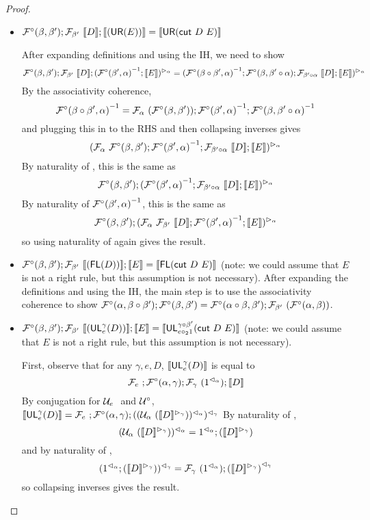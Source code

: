 \documentclass{drl-common/llncs}
\renewcommand{\sem}[1]{\ensuremath{ \llbracket #1 \rrbracket}}
\newcommand{\inv}[1]{\ensuremath{{#1}^{-1}}}
\newcommand\compo[2]{\ensuremath{#1 \circ #2}}
\newcommand\comph[2]{\ensuremath{#1 \mathbin{\circ_2} #2}}
\newcommand\cutsym{\ensuremath{\dsd{cut}}}
\newcommand\cut[2]{\ensuremath{{\cutsym \,\, #1 \,\, #2}}}
\newcommand\UL[3]{\ensuremath{\dsd{UL}^{#1}_{#2}(#3)}}
\newcommand\FL[1]{\ensuremath{\dsd{FL}(#1)}}
\newcommand\UR[1]{\ensuremath{\dsd{UR}(#1)}}
\begin{document}
\begin{proof}
\begin{itemize}
\item $\semofcut D {(\UR E)} = \sem{\UR {\cut D E}}$

After expanding definitions and using the IH, we need to show
\[
\semFcomp(\beta,\beta');\semF{\beta'}{\sem{D}};\semltor{(\inv{\semFcomp(\beta',\alpha)};\sem{E})}{\alpha}
=
\semltor{(\inv{\semFcomp(\compo{\beta}{\beta'},\alpha)};\semFcomp(\beta,\compo{\beta'}{\alpha});\semF{\compo{\beta'}{\alpha}}{\sem D};\sem{E})}{\alpha}
\]
By the associativity coherence, 
\[
\inv{\semFcomp(\compo{\beta}{\beta'},\alpha)} = 
\semF{\alpha}{(\semFcomp(\beta,\beta'))};\inv{\semFcomp(\beta',\alpha)};\inv{\semFcomp(\beta,\compo{\beta'}{\alpha})}
\]
and plugging this in to the RHS and then collapsing inverses gives 
\[
\semltor{(\semF{\alpha}{\semFcomp(\beta,\beta')};\inv{\semFcomp(\beta',\alpha)};\semF{\compo{\beta'}{\alpha}}{\sem D};\sem{E})}{\alpha}
\]
By naturality of \semltor{}{\alpha}, this is the same as
\[
{\semFcomp(\beta,\beta')};\semltor{(\inv{\semFcomp(\beta',\alpha)};\semF{\compo{\beta'}{\alpha}}{\sem D};\sem{E})}{\alpha}
\]
By naturality of \inv{\semFcomp(\beta',\alpha)}, this is the same as 
\[
{\semFcomp(\beta,\beta')};\semltor{(\semF{\alpha}{\semF{\beta'}{\sem D}};\inv{\semFcomp(\beta',\alpha)};\sem{E})}{\alpha}
\]
so using naturality of \semltor{}{\alpha} again gives the result.  

\item $\semofcut {(\FL D)} E = \sem{\FL {\cut D E}}$ (note: we could
  assume that $E$ is not a right rule, but this assumption is not
  necessary).  After expanding the definitions and using the IH, the
  main step is to use the associativity coherence to show
  $\semFcomp(\alpha,\compo{\beta}{\beta'});\semFcomp(\beta,\beta') =
  \semFcomp(\compo{\alpha}{\beta},\beta');\semF{\beta'}(\semFcomp(\alpha,\beta))$.

\item $\semofcut {(\UL \gamma e D)} E = \sem{\UL {\compo{\gamma}{\beta'}}
  {\comph{e}{1}} {\cut D E}}$ (note: we could assume that $E$ is not a
  right rule, but this assumption is not necessary).  

First, observe that for any $\gamma,e,D$, \sem{\UL \gamma e D} is equal to
\[
\semF{e};\semFcomp(\alpha,\gamma);\semF{\gamma}{(\semrtol{1}{\alpha})};\sem{D}
\]
By conjugation for $\semU{e}$ and $\mathcal{U}^\circ$, $\sem{\UL \gamma e D} = 
\semF{e};\semFcomp(\alpha,\gamma);\semrtol{(\semrtol{(\semU{\alpha}{(\semltor{\sem{D}}{\gamma})})}{\alpha})}{\gamma}$
By naturality of \semrtol{-}{\alpha},
\[
{\semrtol{(\semU{\alpha}{(\semltor{\sem{D}}{\gamma})})}{\alpha}} = 
\semrtol{1}{\alpha};{{(\semltor{\sem{D}}{\gamma})}} 
\]
and by naturality of \semrtol{-}{\gamma},
\[
\semrtol{(\semrtol{1}{\alpha};{{(\semltor{\sem{D}}{\gamma})}})}{\gamma}
= \semF{\gamma}{(\semrtol{1}{\alpha})};\semrtol{{{(\semltor{\sem{D}}{\gamma})}}}{\gamma}
\]
so collapsing inverses gives the result.  


\end{itemize}
\end{proof}
\end{document}
